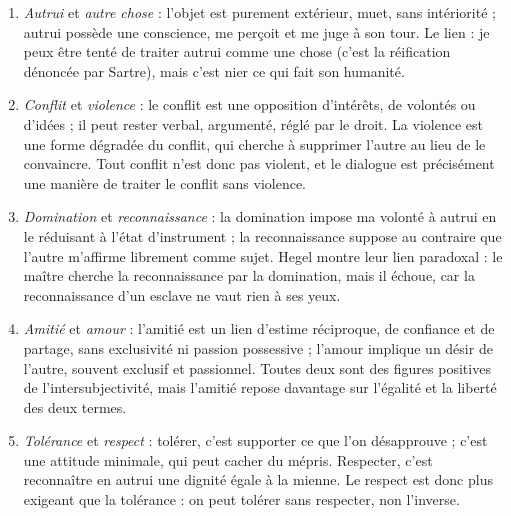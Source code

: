 \documentclass[11pt]{article}
\begin{document}
\begin{corrige}
\begin{enumerate}
\item \emph{Autrui} et \emph{autre chose} : l'objet est purement extérieur, muet, sans intériorité ; autrui possède une conscience, me perçoit et me juge à son tour. Le lien : je peux être tenté de traiter autrui comme une chose (c'est la réification dénoncée par Sartre), mais c'est nier ce qui fait son humanité.
\item \emph{Conflit} et \emph{violence} : le conflit est une opposition d'intérêts, de volontés ou d'idées ; il peut rester verbal, argumenté, réglé par le droit. La violence est une forme dégradée du conflit, qui cherche à supprimer l'autre au lieu de le convaincre. Tout conflit n'est donc pas violent, et le dialogue est précisément une manière de traiter le conflit sans violence.
\item \emph{Domination} et \emph{reconnaissance} : la domination impose ma volonté à autrui en le réduisant à l'état d'instrument ; la reconnaissance suppose au contraire que l'autre m'affirme librement comme sujet. Hegel montre leur lien paradoxal : le maître cherche la reconnaissance par la domination, mais il échoue, car la reconnaissance d'un esclave ne vaut rien à ses yeux.
\item \emph{Amitié} et \emph{amour} : l'amitié est un lien d'estime réciproque, de confiance et de partage, sans exclusivité ni passion possessive ; l'amour implique un désir de l'autre, souvent exclusif et passionnel. Toutes deux sont des figures positives de l'intersubjectivité, mais l'amitié repose davantage sur l'égalité et la liberté des deux termes.
\item \emph{Tolérance} et \emph{respect} : tolérer, c'est supporter ce que l'on désapprouve ; c'est une attitude minimale, qui peut cacher du mépris. Respecter, c'est reconnaître en autrui une dignité égale à la mienne. Le respect est donc plus exigeant que la tolérance : on peut tolérer sans respecter, non l'inverse.
\end{enumerate}
\end{corrige}
\end{document}
